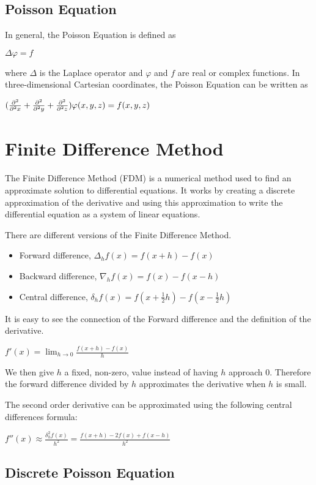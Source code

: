 \subsection*{Poisson Equation}

In general, the Poisson Equation is defined as 

$\Delta \varphi = f$

where $\Delta$ is the Laplace operator and $\varphi$ and $f$ are real or complex 
functions. In three-dimensional Cartesian coordinates, the Poisson Equation can 
be written as 

$(\frac{\partial^2}{\partial^2 x} + \frac{\partial^2}{\partial^2 y} + \frac{\partial^2}{\partial^2 z}) \varphi (x, y, z) = f(x, y, z)$


\section*{Finite Difference Method}

The Finite Difference Method (FDM) is a numerical method used to find an approximate 
solution to differential equations. It works by creating a discrete approximation 
of the derivative and using this approximation to write the differential equation 
as a system of linear equations.

There are different versions of the Finite Difference Method.
\begin{itemize}
	\item Forward difference, $\Delta_hf(x) = f(x+h) - f(x)$
	\item Backward difference, $\nabla_hf(x) = f(x) - f(x - h)$
	\item Central difference, $\delta_hf(x) = f(x + \frac{1}{2}h) - f(x - \frac{1}{2}h)$
\end{itemize}

It is easy to see the connection of the Forward difference and the definition of 
the derivative.

$f'(x) = \lim_{h \to 0} \frac{f(x+h) - f(x)}{h}$

We then give $h$ a fixed, non-zero, value instead of having $h$ approach 0. Therefore 
the forward difference divided by $h$ approximates the derivative when $h$ is small.

The second order derivative can be approximated using the following central differences formula:

$f''(x) \approx \frac{\delta_h^2f(x)}{h^2} = \frac{f(x+h) - 2f(x) + f(x-h)}{h^2}$

\subsection*{Discrete Poisson Equation}


